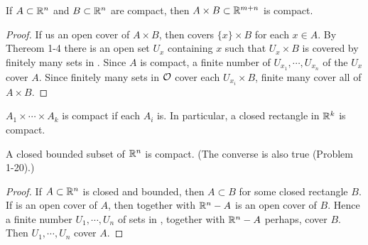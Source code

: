 \begin{corollary}
    If $A\subset \mathbb{R}^n$ and $B\subset \mathbb{R}^n$ are compact, then 
    $A\times B\subset \mathbb{R}^{m+n}$ is compact. 
\end{corollary}

\begin{proof}
    If  us an open cover of $A\times B$, then  covers $\{x\}\times B$ 
    for each $x\in A$. By Thereom 1-4 there is an open set $U_x$ containing 
    $x$ such that $U_x\times B$ is covered by finitely many sets in .
    Since $A$ is compact, a finite number of $U_{x_1}, \cdots, U_{x_n}$ of 
    the $U_x$ cover $A$. Since finitely many sets in $\mathcal{O}$ cover each $U_{x_i}\times B$,
    finite many cover all of $A\times B$. 
\end{proof}

\begin{corollary}
    $A_1\times \cdots\times A_k$ is compact if each $A_i$ is.
    In particular, a closed rectangle in $\mathbb{R}^k$ is compact. 
\end{corollary}

\begin{corollary}
    A closed bounded subset of $\mathbb{R}^n$ is compact. \textup{(The converse is also true (Problem 1-20).)}
\end{corollary}

\begin{proof}
    If $A \subset \mathbb{R}^n$ is closed and bounded, then $A \subset B$ for
    some closed rectangle $B$. If  is an open cover of $A$, then 
    together with $\mathbb{R}^n-A$ is an open cover of $B$. Hence a finite
    number $U_1, \cdots , U_n$ of sets in , together 
    with $\mathbb{R}^n-A$ perhaps, cover $B$. Then $U_1, \cdots, U_n$ cover $A$. 
\end{proof}

